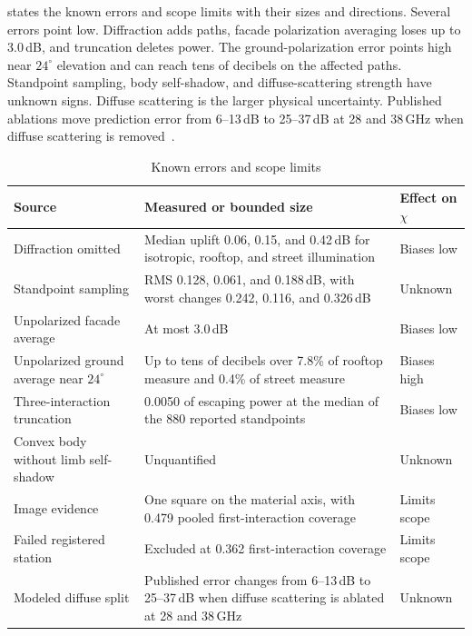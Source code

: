 \documentclass[journal]{IEEEtran}
\begin{document}
 states the known errors and scope limits with their sizes and
directions. Several errors point low. Diffraction adds paths, facade polarization
averaging loses up to 3.0\,dB, and truncation deletes power. The
ground-polarization error points high near $24^\circ$ elevation and can reach
tens of decibels on the affected paths. Standpoint sampling, body self-shadow,
and diffuse-scattering strength have unknown signs. Diffuse scattering is the
larger physical uncertainty. Published ablations move
prediction error from 6--13\,dB to 25--37\,dB at 28 and 38\,GHz when diffuse
scattering is removed~\cite{vitucci}.

\begin{table}[!t]
  \caption{Known errors and scope limits}
  \label{tab:honesty}
  \centering
  \scriptsize
  \setlength{\tabcolsep}{2pt}
  \begin{tabular}{@{}p{}p{}p{}@{}}
    \toprule
    Source & Measured or bounded size & Effect on $\chi$ \\
    \midrule
    Diffraction omitted & Median uplift 0.06, 0.15, and 0.42\,dB for isotropic,
    rooftop, and street illumination & Biases low \\
    Standpoint sampling & RMS 0.128, 0.061, and 0.188\,dB, with worst changes
    0.242, 0.116, and 0.326\,dB & Unknown \\
    Unpolarized facade average & At most 3.0\,dB & Biases low \\
    Unpolarized ground average near $24^\circ$ & Up to tens of decibels over
    7.8\% of rooftop measure and 0.4\% of street measure & Biases high \\
    Three-interaction truncation & 0.0050 of escaping power at the median of
    the 880 reported standpoints &
    Biases low \\
    Convex body without limb self-shadow & Unquantified & Unknown \\
    Image evidence & One square on the material axis, with 0.479 pooled
    first-interaction coverage & Limits scope \\
    Failed registered station & Excluded at 0.362 first-interaction coverage &
    Limits scope \\
    Modeled diffuse split & Published error changes from 6--13\,dB to
    25--37\,dB when diffuse scattering is ablated at 28 and 38\,GHz & Unknown \\
    \bottomrule
  \end{tabular}
\end{table}
\end{document}
